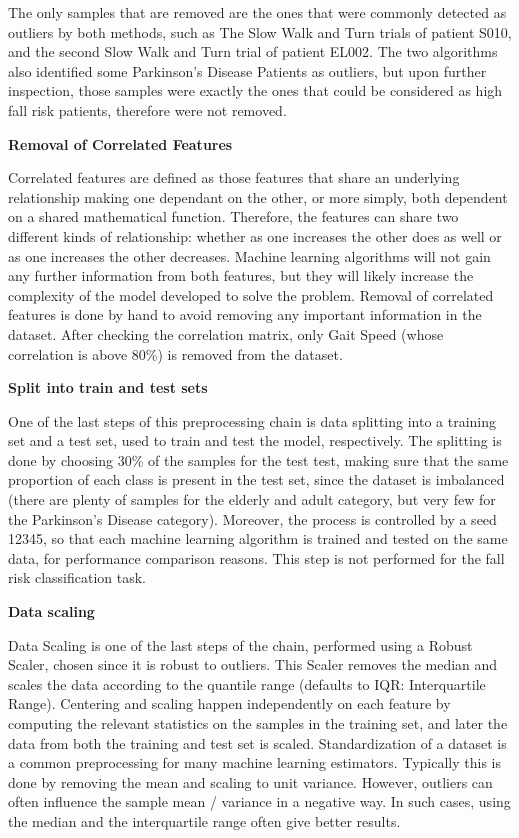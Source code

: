 The only samples that are removed are the ones that were commonly detected as outliers by both methods, such as  The Slow Walk and Turn trials of patient S010, and the second Slow Walk and Turn trial of patient EL002. The two algorithms also identified some Parkinson's Disease Patients as outliers, but upon further inspection, those samples were exactly the ones that could be considered as high fall risk patients, therefore were not removed. 

\textbf{Removal of Correlated Features}

Correlated features are defined as those features that share an underlying relationship making one dependant on the other, or more simply, both dependent on a shared mathematical function. Therefore, the features can share two different kinds of relationship: whether as one increases the other does as well or as one increases the other decreases. Machine learning algorithms will not gain any further information from both features, but they will likely increase the complexity of the model developed to solve the problem.
Removal of correlated features is done by hand to avoid removing any important information in the dataset.
After checking the correlation matrix, only Gait Speed (whose correlation is above 80\%) is removed from the dataset. 

\textbf{Split into train and test sets}

One of the last steps of this preprocessing chain is data splitting into a training set and a test set, used to train and test the model, respectively.
The splitting is done by choosing 30\% of the samples for the test test, making sure that the same proportion of each class is present in the test set, since the dataset is imbalanced (there are plenty of samples for the elderly and adult category, but very few for the Parkinson's Disease category). Moreover, the process is controlled by a seed 12345, so that each machine learning algorithm is trained and tested on the same data, for performance comparison reasons. 
This step is not performed for the fall risk classification task.

\textbf{Data scaling}

Data Scaling is one of the last steps of the chain, performed using a Robust Scaler, chosen since it is robust to outliers. This Scaler removes the median and scales the data according to the quantile range (defaults to IQR: Interquartile Range).
Centering and scaling happen independently on each feature by computing the relevant statistics on the samples in the training set, and later the data from both the training and test set is scaled. 
Standardization of a dataset is a common preprocessing for many machine learning estimators. Typically this is done by removing the mean and scaling to unit variance. However, outliers can often influence the sample mean / variance in a negative way. In such cases, using the median and the interquartile range often give better results. 

